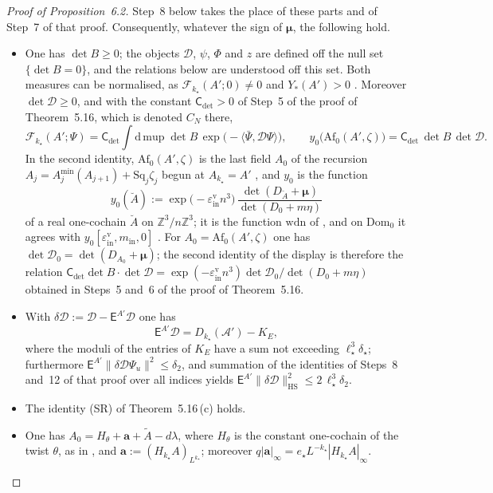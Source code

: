\documentclass[11pt,letterpaper,reqno]{amsart}
\theoremstyle{definition}
\begin{document}
\begin{proof}[Proof of Proposition~6.2]
Step~8 below takes the place of these parts and of Step~7 of that proof.
Consequently, whatever the sign of $\boldsymbol\mu$, the following hold.
\begin{itemize}
\item[(i)] One has $\det B\ge0$;
the objects $\mathcal D$, $\psi$, $\Phi$ and $z$ are defined off the null set $\{\det B=0\}$, and the relations below are understood off this set.
Both measures can be normalised, as $\mathscr F_{k_\star}(A';0)\ne0$ and $Y_*(A')>0$ \cite[Proposition~32.1]{QEDIII}.
Moreover $\det\mathcal D\ge0$, and with the constant $\mathsf C_{\det}>0$ of Step~5 of the proof of Theorem~5.16, which is denoted $C_N$ there,
\begin{equation*}
\mathscr F_{k_\star}(A';\Psi)=\mathsf C_{\det}\int\mathrm d\,\mathrm{mup}\;\det B\,\exp\bigl(-\langle\bar\Psi,\mathcal D\Psi\rangle\bigr),\qquad y_0\bigl(\mathrm{Af}_0(A',\zeta)\bigr)=\mathsf C_{\det}\,\det B\,\det\mathcal D .
\end{equation*}
In the second identity, $\mathrm{Af}_0(A',\zeta)$ is the last field $A_0$ of the recursion $A_j=A^{\min}_j(A_{j+1})+\mathrm{Sq}_j\zeta_j$ begun at $A_{k_\star}=A'$ \cite[Sections~I.5.7, G4.0.6]{QEDIII}, and $y_0$ is the function
\begin{equation*}
y_0(\breve A):=\exp\bigl(-\varepsilon^{\mathrm v}_{\mathrm{in}}n^3\bigr)\,\frac{\det(D_{\breve A}+\boldsymbol\mu)}{\det(D_0+m\eta)}
\end{equation*}
of a real one-cochain $\breve A$ on $\mathbb Z^3/n\mathbb Z^3$;
it is the function $\mathrm{wdn}$ of \cite[Chapter~29, (29.1)]{QEDIII}, and on $\mathrm{Dom}_0$ it agrees with $y_0[\varepsilon^{\mathrm v}_{\mathrm{in}},m_{\mathrm{in}},0]$ \cite[Section~I.5.7; Chapter~29, Lemma~1\,(iv)]{QEDIII}.
For $A_0=\mathrm{Af}_0(A',\zeta)$ one has $\det\mathcal D_0=\det(D_{A_0}+\boldsymbol\mu)$;
the second identity of the display is therefore the relation $\mathsf C_{\det}\det B\cdot\det\mathcal D=\allowbreak \exp(-\varepsilon^{\mathrm v}_{\mathrm{in}}n^3)\det\mathcal D_0/\det(D_0+m\eta)$ obtained in Steps~5 and~6 of the proof of Theorem~5.16.
\item[(ii)] With $\delta\mathcal D:=\mathcal D-\mathsf E^{A'}\mathcal D$ one has
\begin{equation*}
\mathsf E^{A'}\mathcal D=D_{k_\star}(\mathscr A')-K_E,
\end{equation*}
where the moduli of the entries of $K_E$ have a sum not exceeding $\ell_\star^3\delta_\star$;
furthermore $\mathsf E^{A'}\|\delta\mathcal D\Psi_u\|^2\le\delta_2$, and summation of the identities of Steps~8 and~12 of that proof over all indices yields $\mathsf E^{A'}\|\delta\mathcal D\|^2_{\mathrm{HS}}\le2\,\allowbreak \ell_\star^3\delta_2$.
\item[(iii)] The identity (SR) of Theorem~5.16\,(c) holds.
\item[(iv)] One has $A_0=H_\theta+\mathbf a+\tilde A-d\lambda$, where $H_\theta$ is the constant one-cochain of the twist $\theta$, as in \cite[Section~I.6.6]{QEDIII}, and $\mathbf a:=(H_{k_\star}A)_{L^{k_\star}}$;
moreover $q|\mathbf a|_\infty=e_\star L^{-k_\star}|H_{k_\star}A|_\infty$.
\end{itemize}


\end{proof}
\end{document}
